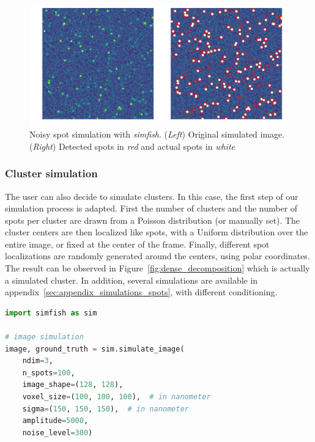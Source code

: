 \begin{figure}[h]
    \centering
    \includegraphics[width=1\textwidth]{figures/chapter2/plot_spot_detection}
    \caption{Noisy spot simulation with \emph{simfish}.
	(\textit{Left}) Original simulated image.
	(\textit{Right}) Detected spots in \textit{red} and actual spots in \textit{white}}
    \label{fig:spot_detection_high_noise}
\end{figure}

\subsubsection{Cluster simulation}

The user can also decide to simulate clusters.
In this case, the first step of our simulation process is adapted.
First the number of clusters and the number of spots per cluster are drawn from a Poisson distribution (or manually set).
The cluster centers are then localized like spots, with a Uniform distribution over the entire image, or fixed at the center of the frame.
Finally, different spot localizations are randomly generated around the centers, using polar coordinates.
The result can be observed in Figure~\ref{fig:dense_decomposition} which is actually a simulated cluster.
In addition, several simulations are available in appendix~\ref{sec:appendix_simulations_spots}, with different conditioning.\\

\begin{minipage}{0.9\textwidth}
\begin{lstlisting}[language=Python]
import simfish as sim

# image simulation
image, ground_truth = sim.simulate_image(
	ndim=3,
	n_spots=100,
	image_shape=(128, 128),
	voxel_size=(100, 100, 100),  # in nanometer
	sigma=(150, 150, 150),  # in nanometer
	amplitude=5000,
	noise_level=300)
\end{lstlisting}
\end{minipage}

